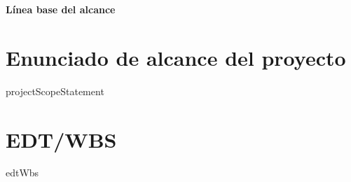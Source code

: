 \documentclass[10pt]{article}
\begin{document}
    \begin{center}
    {\huge\textbf{Línea base del alcance}}\\[1cm]
    \end{center}

    \newpage
    
    \tableofcontents
    \newpage
    
    \section{Enunciado de alcance del proyecto}
    {{projectScopeStatement}}
    
    \section{EDT/WBS}
    {{edtWbs}}
\end{document}

